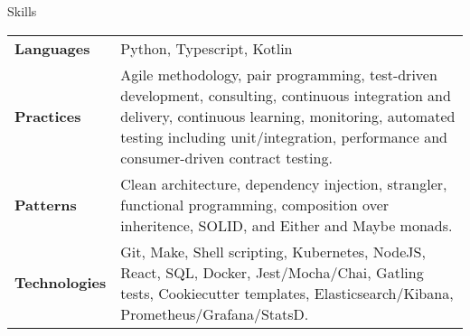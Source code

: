 \begin{section}{Skills}
  \begin{tabularx}{\linewidth}{@{}l X@{}}
    \textbf{Languages} &\small{Python, Typescript, Kotlin} \\
    \textbf{Practices} &\small{Agile methodology, pair programming, test-driven development, consulting, continuous integration and delivery, continuous learning, monitoring, automated testing including unit/integration, performance and consumer-driven contract testing.} \\
    \textbf{Patterns} &\small{Clean architecture, dependency injection, strangler, functional programming, composition over inheritence, SOLID, and Either and Maybe monads.} \\
    \textbf{Technologies} &\small{Git, Make, Shell scripting, Kubernetes, NodeJS, React, SQL, Docker, Jest/Mocha/Chai, Gatling tests, Cookiecutter templates, Elasticsearch/Kibana, Prometheus/Grafana/StatsD.} \\ 
  \end{tabularx}
\end{section}

